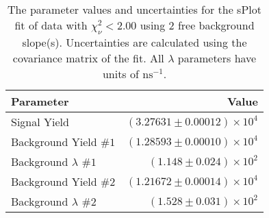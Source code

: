 
\begin{table}
    \begin{center}
        \begin{tabular}{lr}\toprule
            Parameter & Value \\\midrule
            Signal Yield & $(3.27631 \pm 0.00012) \times 10^{4}$ \\
            Background Yield $\#1$ & $(1.28593 \pm 0.00010) \times 10^{4}$ \\
            Background $\lambda$ $\#1$ & $(1.148 \pm 0.024) \times 10^{2}$ \\
            Background Yield $\#2$ & $(1.21672 \pm 0.00014) \times 10^{4}$ \\
            Background $\lambda$ $\#2$ & $(1.528 \pm 0.031) \times 10^{2}$ \\\bottomrule
        \end{tabular}
        \caption{The parameter values and uncertainties for the sPlot fit of data with $\chi^2_\nu < 2.00$ using 2 free background slope(s). Uncertainties are calculated using the covariance matrix of the fit. All $\lambda$ parameters have units of $\si{\nano\second}^{-1}$.}
    \end{center}
\end{table}
